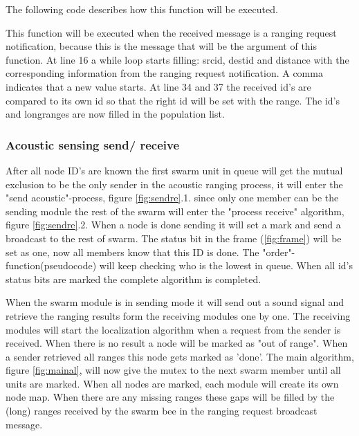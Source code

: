 \documentclass[10pt,a4paper]{article}
\begin{document}
The following code describes how this function will be executed.


This function will be executed when the received message is a ranging request notification, because this is the message that will be the argument of this function. At line 16 a while loop starts filling: srcid, destid and distance with the corresponding information from the ranging request notification. A comma indicates that a new value starts. At line 34 and 37 the received id's are compared to its own id so that the right id will be set with the range. The id's and longranges are now filled in the population list.  

\subsubsection{Acoustic sensing send/ receive}
After all node ID's are known the first swarm unit in queue will get the mutual exclusion to be the only sender in the acoustic ranging process, it will enter the "send acoustic"-process, figure \ref{fig:sendre}.1. since only one member can be the sending module the rest of the swarm will enter the "process receive" algorithm, figure \ref{fig:sendre}.2. When a node is done sending it will set a mark and send a broadcast to the rest of swarm. The status bit in the frame (\ref{fig:frame}) will be set as one, now all members know that this ID is done. The "order"-function(pseudocode) will keep checking who is the lowest in queue. When all id's status bits are marked the complete algorithm is completed.



When the swarm module is in sending mode it will send out a sound signal and retrieve the ranging results form the receiving modules one by one. The receiving modules will start the localization algorithm when a request from the sender is received. When there is no result a node will be marked as "out of range". When a sender retrieved all ranges this node gets marked as 'done'. The main algorithm, figure \ref{fig:mainal}, will now give the mutex to the next swarm member until all units are marked. When all nodes are marked, each module will create its own node map. When there are any missing ranges these gaps will be filled by the (long) ranges received by the swarm bee in the ranging request broadcast message.
\end{document}
